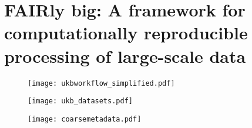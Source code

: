 \pagebreak

\section{FAIRly big: A framework for computationally reproducible processing of large-scale data}



\begin{figure}
	\centering
	\texttt{[image: ukbworkflow\_simplified.pdf]}
	\caption[]{}
	\label{fig:fairly_workflow}
\end{figure}

\begin{figure}
	\centering
	\texttt{[image: ukb\_datasets.pdf]}
	\caption[]{}
	\label{fig:fairly_datasets}
\end{figure}

\begin{figure}
	\centering
	\texttt{[image: coarsemetadata.pdf]}
	\caption[]{}
	\label{fig:fairly_metadata}
\end{figure}



\pagebreak